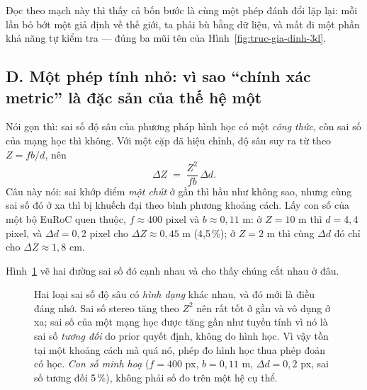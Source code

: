 \documentclass[../../../deep_learning.tex]{subfiles}
\begin{document}
Đọc theo mạch này thì thấy cả bốn bước là cùng một phép đánh đổi lặp lại: mỗi lần bỏ bớt một giả định về thế giới, ta phải bù bằng dữ liệu, và mất đi một phần khả năng tự kiểm tra --- đúng ba mũi tên của Hình~\ref{fig:truc-gia-dinh-3d}.

\subsection{D. Một phép tính nhỏ: vì sao ``chính xác metric'' là đặc sản của thế hệ một}
Nói gọn thì: sai số độ sâu của phương pháp hình học có một \emph{công thức}, còn sai số của mạng học thì không. Với một cặp  đã hiệu chỉnh, độ sâu suy ra từ  theo \(Z = fb/d\), nên
\[
\Delta Z \;=\; \frac{Z^{2}}{fb}\,\Delta d .
\]
Câu này nói: sai khớp điểm \emph{một chút} ở gần thì hầu như không sao, nhưng cùng sai số đó ở xa thì bị khuếch đại theo bình phương khoảng cách. Lấy con số của một bộ EuRoC quen thuộc, \(f \approx 400\) pixel và \(b \approx 0{,}11\) m: ở \(Z = 10\) m thì \(d = 4{,}4\) pixel, và \(\Delta d = 0{,}2\) pixel cho \(\Delta Z \approx 0{,}45\) m (4,5\,\%); ở \(Z = 2\) m thì cùng \(\Delta d\) đó chỉ cho \(\Delta Z \approx 1{,}8\) cm.

Hình~\ref{fig:sai-so-do-sau} vẽ hai đường sai số đó cạnh nhau và cho thấy chúng cắt nhau ở đâu.

\begin{figure}[H]\centering
{}
\caption{Hai loại sai số độ sâu có \emph{hình dạng} khác nhau, và đó mới là điều đáng nhớ. Sai số stereo tăng theo \(Z^{2}\) nên rất tốt ở gần và vô dụng ở xa; sai số của một mạng học được tăng gần như tuyến tính vì nó là sai số \emph{tương đối} do prior quyết định, không do hình học. Vì vậy tồn tại một khoảng cách mà quá nó, phép đo hình học thua phép đoán có học. \emph{Con số minh hoạ} (\(f=400\) px, \(b=0{,}11\) m, \(\Delta d=0{,}2\) px, sai số tương đối 5\,\%), không phải số đo trên một hệ cụ thể.}
\label{fig:sai-so-do-sau}
\end{figure}
\end{document}
